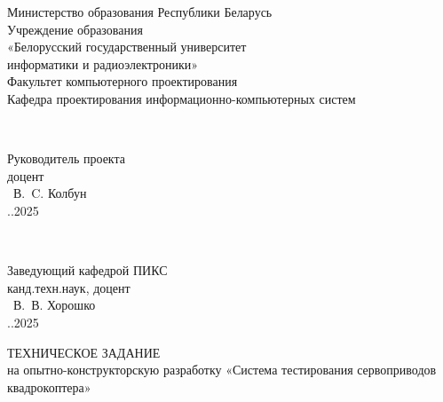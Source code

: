 \begin{titlepage}
\begin{center}
Министерство образования Республики Беларусь\\
Учреждение образования\\
«Белорусский государственный университет \\
информатики и радиоэлектроники»\\[1.2em]

Факультет компьютерного проектирования\\
Кафедра проектирования информационно-компьютерных систем\\
\end{center}

\vfill

\begin{minipage}{8cm}
  \begin{flushleft}
    \\
    \raggedright %
    Руководитель проекта\\
    доцент\\
    \underline{\hspace*{2cm}} ~В.~C. Колбун\\
    \underline{\hspace*{0.5cm}}.\underline{\hspace*{0.5cm}}.2025\\
  \end{flushleft}
\end{minipage}
\hfill
\begin{minipage}{8cm}
  \begin{flushright}
    \\
    \raggedright
    Заведующий кафедрой ПИКС\\
    канд.техн.наук, доцент\\
    \underline{\hspace*{2cm}} ~В.~В. Хорошко\\
    \underline{\hspace*{0.5cm}}.\underline{\hspace*{0.5cm}}.2025\\
  \end{flushright}
\end{minipage}


\vfill
\begin{center}
  ТЕХНИЧЕСКОЕ ЗАДАНИЕ\\
  на опытно-конструкторскую разработку
  «Система тестирования сервоприводов квадрокоптера»
\end{center}


\end{titlepage}
